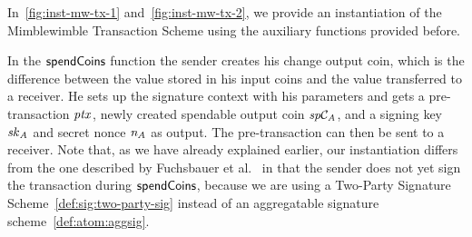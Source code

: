 \begin{center}
    \fbox{
    \begin{varwidth}{\textwidth}
        \procedure[linenumbering]{$\procCreateCoin{\varValue}{\varBlindingFactor}$} {
        \varCommitment \opFunResult \procCommit{\varValue}{\varBlindingFactor} \\
        \varProof \opFunResult \procProof{\varCoin}{\varValue}{\varBlindingFactor} \\
        \pcreturn (\varCommitment, \varBlindingFactor, \varValue, \varProof)
        }
        \procedure[linenumbering]{$\procCreatePreTx{\varMsg}{\funArray{\varCoinInp}}{\funArray{\varCoinOut}}{\funArray{\varProof}}{\varSigContext}{\funArray{\varCommitment}}{\varSignature}{\varTime}$}{
        \pcreturn ( \pcskipln \\
        \varMsg \opAssign \varMsg, \pcskipln \\
        \varInputs \opAssign \funArray{\varCoinInp}, \pcskipln \\
        \varOutputs \opAssign \funArray{\varCoinOut}, \pcskipln \\
        \varProofs \opAssign \funArray{\varProof}, \pcskipln \\
        \varSigContext \opAssign \varSigContext, \pcskipln \\
        \varCommits \opAssign \funArray{\varCommitment}, \pcskipln \\
        \varSignature \opAssign \varSignature, \pcskipln \\
        \varTime \opAssign \varTime
        )
        }
    \end{varwidth}
    }
\end{center}

In~\cref{fig:inst-mw-tx-1} and~\cref{fig:inst-mw-tx-2}, we provide an instantiation of the Mimblewimble Transaction Scheme using the auxiliary functions provided before.

In the $\mathsf{spendCoins}$ function the sender creates his change output coin, which is the difference between the value stored in his input coins and the value transferred to a receiver.
He sets up the signature context with his parameters and gets a pre-transaction $\mathit{ptx}$, newly created spendable output coin $\mathit{sp}\mathcal{C}_{\mathit{A}}$, and a signing key $\mathit{sk}_{\mathit{A}}$ and secret nonce $\mathit{\mathit{n}_{\mathit{A}}}$ as output.
The pre-transaction can then be sent to a receiver.
Note that, as we have already explained earlier, our instantiation differs from the one described by Fuchsbauer et al.~\cite{fuchsbauer2019aggregate} in that the sender does not yet sign the transaction during $\mathsf{spendCoins}$, because we are using a Two-Party Signature Scheme~\cref{def:sig:two-party-sig} instead of an aggregatable signature scheme~\cref{def:atom:aggsig}.

